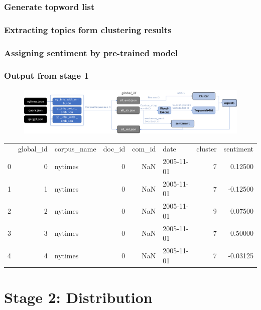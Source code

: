 \documentclass{tum-presentation}
\begin{document}
\subsubsection{Generate topword list}%
\subsubsection{Extracting topics form clustering results}
\subsubsection{Assigning sentiment by pre-trained model}


\begin{frame}
  \frametitle{Output from stage 1}
    
  \begin{figure}[t]
    \includegraphics[width = \textwidth]{figures/journey.pdf}
    \end{figure}

\begin{tabular}{lrlrrlrr}
  {} &  global\_id & corpus\_name &  doc\_id &  com\_id &        date &  cluster &  sentiment \\
  
  0 &          0 &     nytimes &       0 &     NaN &  2005-11-01 &        7 &    0.12500 \\
  1 &          1 &     nytimes &       0 &     NaN &  2005-11-01 &        7 &   -0.12500 \\
  2 &          2 &     nytimes &       0 &     NaN &  2005-11-01 &        9 &    0.07500 \\
  3 &          3 &     nytimes &       0 &     NaN &  2005-11-01 &        7 &    0.50000 \\
  4 &          4 &     nytimes &       0 &     NaN &  2005-11-01 &        7 &   -0.03125 \\
 
  \end{tabular}
\end{frame}

\section{Stage 2: Distribution}
\end{document}
